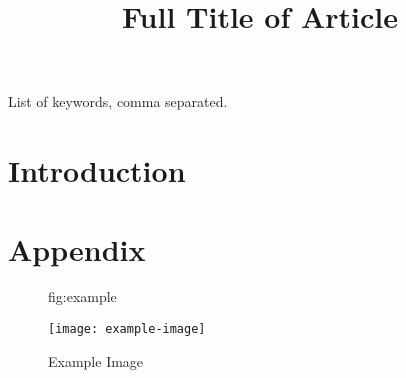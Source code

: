 \documentclass[anon]{midl}
\title[Short Title]{Full Title of Article}
\begin{document}
\maketitle

\begin{abstract}
\blindtext
\end{abstract}

\begin{keywords}
List of keywords, comma separated.
\end{keywords}

\section{Introduction}

\Blindtext[5][2]

\acks{\blindtext}

\appendix
\section{Appendix}

\begin{figure}[htbp]
\floatconts
  {fig:example}
  {\caption{Example Image}}
  {\texttt{[image: example-image]}}
\end{figure}
\end{document}
